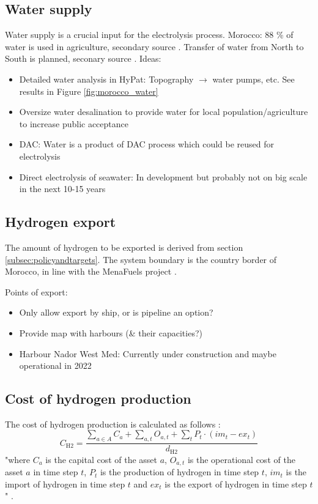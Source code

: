 \subsection{Water supply}
\label{subsec:water_supply}
Water supply is a crucial input for the electrolysis process. 
Morocco: 88 \% of water is used in agriculture, secondary source \cite{Ersoy2022}.
Transfer of water from North to South is planned, seconary source \cite{Ersoy2022}.
Ideas:
\begin{itemize}
    \item Detailed water analysis in HyPat: Topography $\rightarrow$ water pumps, etc. See results in Figure \ref{fig:morocco_water}
    \item Oversize water desalination to provide water for local population/agriculture to increase public acceptance
    \item DAC: Water is a product of DAC process which could be reused for electrolysis
    \item Direct electrolysis of seawater: In development but probably not on big scale in the next 10-15 years
\end{itemize}



\subsection{Hydrogen export}
\label{subsec:hydrogen_export}
The amount of hydrogen to be exported is derived from section \ref{subsec:policyandtargets}.
The system boundary is the country border of Morocco, in 
line with the MenaFuels project \cite{Ersoy2022}.

Points of export:
\begin{itemize}
    \item Only allow export by ship, or is pipeline an option?
    \item Provide map with harbours (\& their capacities?)
    \item Harbour Nador West Med: Currently under construction and maybe operational in 2022 \cite{Ersoy2022}
\end{itemize}


\subsection{Cost of hydrogen production}
\label{subsec:cost_of_hydrogen_production}

The cost of hydrogen production is calculated as follows \cite{Zeyen2022}:
\begin{equation}
    \label{eq:cost_of_hydrogen_production}
    C_\mathrm{H2}= \frac{\sum \limits_{a\in A}^{} C_a + \sum \limits_{a,t} O_{a,t} + \sum \limits_{t} P_t \cdot (im_t - ex_t)   }{d_\mathrm{H2}}
\end{equation}
"where $C_a$ is the capital cost of the asset $a$, $O_{a,t}$ is the operational cost of the asset $a$ in time step $t$, $P_t$ is the production of hydrogen in time step $t$, $im_t$ is the import of hydrogen in time step $t$ and $ex_t$ is the export of hydrogen in time step $t$" \cite{Zeyen2022}.


